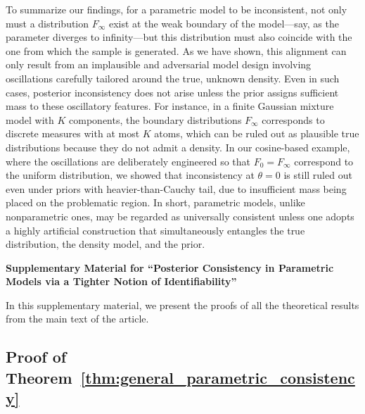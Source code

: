 \documentclass[11pt,twoside]{article}
\begin{document}
To summarize our findings, for a parametric model to be inconsistent, not only must a distribution \( F_\infty \) exist at the weak boundary of the model---say, as the parameter diverges to infinity---but this distribution must also coincide with the one from which the sample is generated. As we have shown, this alignment can only result from an implausible and adversarial model design involving oscillations carefully tailored around the true, unknown density. Even in such cases, posterior inconsistency does not arise unless the prior assigns sufficient mass to these oscillatory features. For instance, in a finite Gaussian mixture model with \( K \) components, the boundary distributions \( F_\infty \) corresponds to discrete measures with at most \( K \) atoms, which can be ruled out as plausible true distributions because they do not admit a density. In our cosine-based example, where the oscillations are deliberately engineered so that \( F_0 = F_\infty \) correspond to the uniform distribution, we showed that inconsistency at $\theta=0$ is still ruled out even under priors with heavier-than-Cauchy tail, due to insufficient mass being placed on the problematic region. In short, parametric models, unlike nonparametric ones, may be regarded as universally consistent unless one adopts a highly artificial construction that simultaneously entangles the true distribution, the density model, and the prior.




\clearpage
\appendix

\begin{center}
{\bf{\Large{Supplementary Material for ``Posterior Consistency in Parametric Models via a Tighter Notion of Identifiability''}}}
\end{center}

In this supplementary material, we present the proofs of all the theoretical results from the main text of the article.


\subsection*{Proof of Theorem~\ref{thm:general_parametric_consistency}} %
\end{document}
